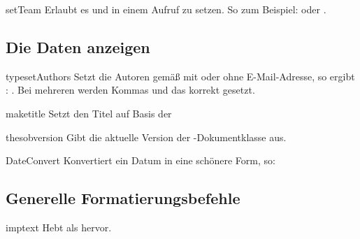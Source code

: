 \documentclass{sopra-base}
\begin{document}
\begin{command}{setTeam}{}
    Erlaubt es  und  in einem Aufruf zu setzen.
    So zum Beispiel:  oder
    .
\end{command}

\subsection{Die Daten anzeigen}

\begin{command}{typesetAuthors}{}
    Setzt die Autoren gemäß  mit oder
    ohne E-Mail-Adresse, so ergibt : \typesetAuthors.
    Bei mehreren werden Kommas und das  korrekt gesetzt.
\end{command}

\begin{command}{maketitle}{}
    Setzt den Titel auf Basis der 
\end{command}

\begin{command}{thesobversion}{}
    Gibt die aktuelle Version der -Dokumentklasse aus. 
\end{command}

\begin{command}{DateConvert}{}
    Konvertiert ein Datum in eine schönere Form, so:
\begin{plainlatex}[morekeywords={[5]{\\DateConvert}}]
\end{plainlatex}
\end{command}

\subsection{Generelle Formatierungsbefehle}

\begin{command}{imptext}{}
    Hebt  als  hervor.
\end{command}
\end{document}
